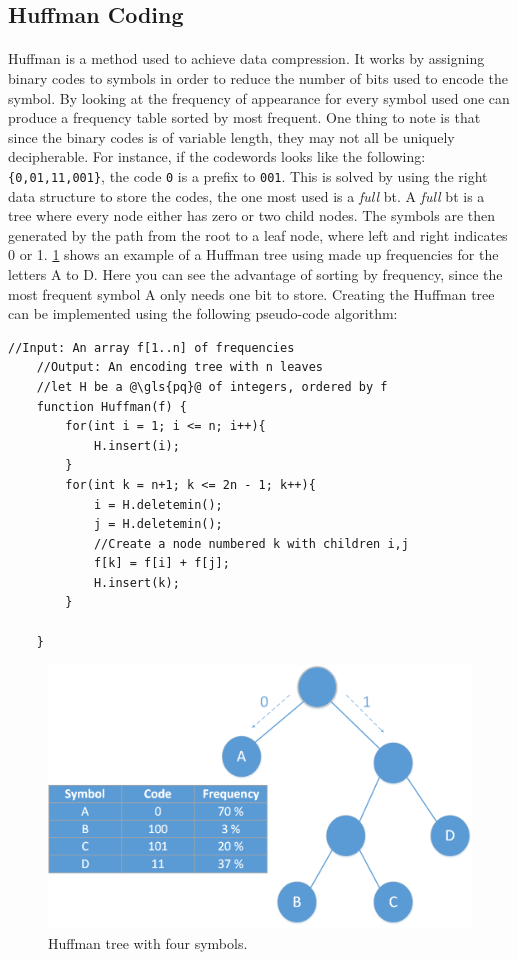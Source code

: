 \documentclass[a4paper, 12pt]{report}
\newcommand{\codeword}[1]{\texttt{#1}}
\begin{document}
\subsection{Huffman Coding} %
\paragraph{}
Huffman is a method used to achieve data compression\cite{huffman}.
It works by assigning binary codes to symbols in order to reduce the number of bits used to encode the symbol.
By looking at the frequency of appearance for every symbol used one can produce a frequency table sorted by most frequent.
One thing to note is that since the binary codes is of variable length, they may not all be uniquely decipherable.
For instance, if the codewords looks like the following: \codeword{\{0,01,11,001\}}, the code \codeword{0} is a prefix to \codeword{001}.
This is solved by using the right data structure to store the codes, the one most used is a \textit{full} \gls{bt}.
A \textit{full} \gls{bt} is a tree where every node either has zero or two child nodes.
The symbols are then generated by the path from the root to a leaf node, where left and right indicates 0 or 1.
\ref{fig:hm-ex} shows an example of a Huffman tree using made up frequencies for the letters A to D.
Here you can see the advantage of sorting by frequency, since the most frequent symbol A only needs one bit to store.
Creating the Huffman tree can be implemented using the following pseudo-code algorithm:

\begin{lstlisting}[caption=Huffman algorithm \cite{algorithms}, label=lst:huffman]
	//Input: An array f[1..n] of frequencies
	//Output: An encoding tree with n leaves
	//let H be a @\gls{pq}@ of integers, ordered by f
	function Huffman(f) {
		for(int i = 1; i <= n; i++){
			H.insert(i);
		}
		for(int k = n+1; k <= 2n - 1; k++){
			i = H.deletemin();
			j = H.deletemin();
			//Create a node numbered k with children i,j
			f[k] = f[i] + f[j];
			H.insert(k);
		}

	}
\end{lstlisting}

\begin{figure}[h!]
	\centering
		\includegraphics[width=1.0\textwidth]{images/huffman.png}
		\caption{Huffman tree with four symbols.}
		\label{fig:hm-ex}
\end{figure}
\end{document}
